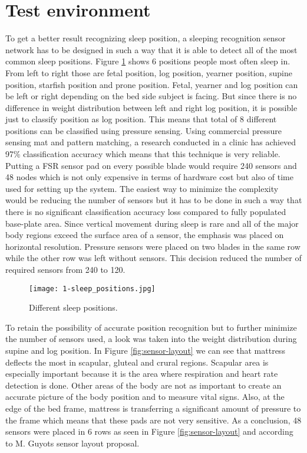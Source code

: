 \section{Test environment}
\label{ssec:test_environment}

To get a better result recognizing sleep position, a sleeping recognition sensor network has to be designed in such a way that it is able to detect all of the most common sleep positions. Figure \ref{fig:sleep_positions} shows 6 positions people most often sleep in. From left to right those are fetal position, log position, yearner position, supine position, starfish position and prone position. Fetal, yearner and log position can be left or right depending on the bed side subject is facing. But since there is no difference in weight distribution between left and right log position, it is possible just to classify position as log position. This means that total of 8 different positions can be classified using pressure sensing. Using commercial pressure sensing mat and pattern matching, a research conducted in a clinic has achieved 97\% classification accuracy\cite{postures} which means that this technique is very reliable. Putting a \ac{FSR} sensor pad on every possible blade would require 240 sensors and 48 nodes which is not only expensive in terms of hardware cost but also of time used for setting up the system. The easiest way to minimize the complexity would be reducing the number of sensors but it has to be done in such a way that there is no significant classification accuracy loss compared to fully populated base-plate area. Since vertical movement during sleep is rare and all of the major body regions exceed the surface area of a sensor, the emphasis was placed on horizontal resolution. Pressure sensors were placed on two blades in the same row while the other row was left without sensors. This decision reduced the number of required sensors from 240 to 120.

\begin{figure}[h]
  \begin{center}
    \texttt{[image: 1-sleep\_positions.jpg]}
  \end{center}
  \caption{Different sleep positions.}
  \label{fig:sleep_positions}
\end{figure}

To retain the possibility of accurate position recognition but to further minimize the number of sensors used, a look was taken into the weight distribution during supine and log position. In Figure \ref{fig:sensor-layout} we can see that mattress deflects the most in scapular, gluteal and crural regions. Scapular area is especially important because it is the area where respiration and heart rate detection is done. Other areas of the body are not as important to create an accurate picture of the body position and to measure vital signs. Also, at the edge of the bed frame, mattress is transferring a significant amount of pressure to the frame which means that these pads are not very sensitive. As a conclusion, 48 sensors were placed in 6 rows as seen in Figure \ref{fig:sensor-layout} and according to M. Guyots\cite{Guyot} sensor layout proposal.


